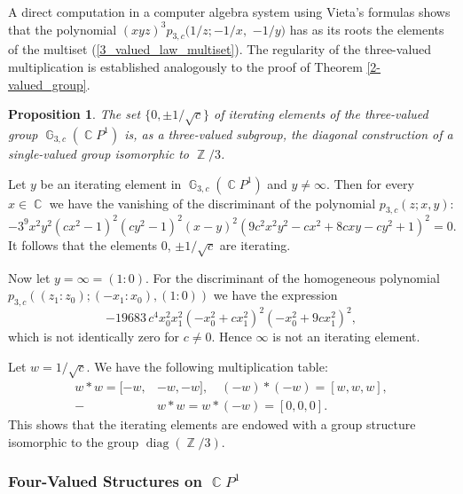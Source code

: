 \documentclass[14pt, dvipsnames]{extarticle}
\makeatletter
\theoremstyle{plain}
\newtheorem{prop}{Proposition}
\theoremstyle{definition}
\theoremstyle{remark}
\renewenvironment{proof}[1][\proofname]{
  \par\pushQED{\qed}\normalfont
  \topsep6\p@\@plus6\p@\relax
  \trivlist\item[\hskip\labelsep\bfseries\itshape #1\@addpunct{.}]
}{\popQED\endtrivlist\@endpefalse}
\DeclareMathOperator{\G}{\mathbb{G}}
\DeclareMathOperator{\Z}{\mathbb{Z}}
\DeclareMathOperator{\Cc}{\mathbb{C}}
\DeclareMathOperator{\diag}{\mathrm{diag}}
\makeatother
\begin{document}
\begin{proof}
{A direct computation in a computer algebra system using Vieta's formulas shows that the polynomial $(xyz)^3p_{3, c}(1/z; -1/x,$ $ -1/y)$ has as its roots the elements of the multiset (\ref{3_valued_law_multiset}). The regularity of the three-valued multiplication is established analogously to the proof of Theorem \ref{2-valued_group}.}
\end{proof}

\begin{prop}\label{iterating_3-val}
The set $\{0, \pm1/\sqrt{c}\}$ of iterating elements of the three-valued group $\G_{3, c}(\Cc\!P^1)$ is, as a three-valued subgroup, the diagonal construction of a single-valued group isomorphic to $\Z/3$.
\end{prop}

\begin{proof}
Let $y$ be an iterating element in $\G_{3, c}(\Cc\!P^1)$ and {$y\neq\infty$}. Then for every $x\in\Cc$ we have the vanishing of the discriminant of the polynomial $p_{3, c}(z; x, y)$:
$$-3^9 x^2 y^2 \left(c x^2-1\right)^2 \left(c y^2-1\right)^2 (x-y)^2 \left(9 c^2 x^2 y^2-c x^2+8 c x y-c y^2+1\right)^2 = 0.$$
It follows that the elements $0$, $\pm1/\sqrt{c}$ are iterating. 

{Now let $y=\infty = (1:0)$. For the discriminant of the homogeneous polynomial $p_{3, c}((z_1:z_0); (-x_1:x_0),(1:0))$ we have the expression
$$-19683\,c^{4}x_{0}^{2}x_{1}^{2}\left(-x_{0}^{2}+cx_{1}^{2}\right)^{2}\left(-x_{0}^{2}+9cx_{1}^{2}\right)^{2},$$
which is not identically zero for $c\neq 0$. Hence $\infty$ is not an iterating element.}  

Let $w = 1/\sqrt{c}$. We have the following multiplication table:
$$\begin{aligned}
 w\ast w = [-w, &-w, -w],\quad (-w)\ast(-w) = [w,w,w],\\
 -&w\ast w = w\ast (-w) = [0, 0, 0].
\end{aligned}$$
This shows that the iterating elements are endowed with a group structure isomorphic to the group $\diag(\Z/3)$.
\end{proof}



\subsubsection{Four-Valued Structures on $\Cc\!P^1$}
\end{document}
